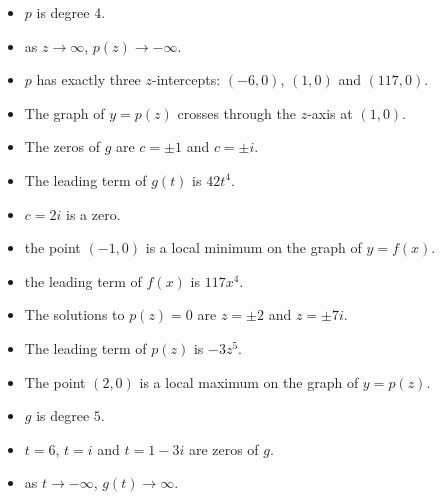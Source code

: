 \begin{exenum}
\begin{itemize}
\item $p$ is degree 4.
\item as $z \rightarrow \infty$, $p(z) \rightarrow -\infty$.
\item $p$ has exactly three $z$-intercepts:  $(-6,0)$, $(1,0)$ and $(117,0)$.
\item  The graph of $y=p(z)$ crosses through the $z$-axis at $(1,0)$.

\end{itemize}

\item

\begin{itemize}

\item The zeros of $g$ are $c=\pm 1$ and $c = \pm i$.
\item The leading term of $g(t)$ is $42t^4$.

\end{itemize}

\item

\begin{itemize}

\item $c=2i$ is a zero.
\item the point $(-1,0)$ is a local minimum on the graph of $y=f(x)$.
\item the leading term of $f(x)$ is $117x^4$.

\end{itemize}

\item

\begin{itemize}

\item The solutions to $p(z) = 0$ are $z = \pm 2$ and $z=\pm 7i$.
\item The leading term of $p(z)$ is $-3z^5$.
\item The point $(2,0)$ is a local maximum on the graph of $y=p(z)$.

\end{itemize}

\item

\begin{itemize}

\item $g$ is degree $5$.
\item $t=6$, $t = i$ and $t = 1-3i$ are zeros of $g$.
\item as $t \rightarrow -\infty$, $g(t) \rightarrow \infty$.


\end{itemize}
\end{exenum}
